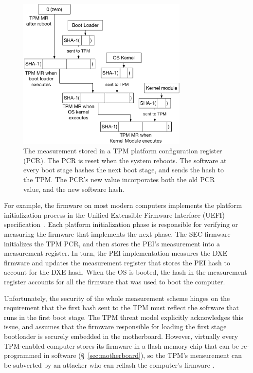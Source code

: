 \begin{figure}[hbt]
  \centering
  \includegraphics[width=85mm]{figures/tpm_measurement.pdf}
  \caption{
    The measurement stored in a TPM platform configuration register (PCR). The
    PCR is reset when the system reboots. The software at every boot stage
    hashes the next boot stage, and sends the hash to the TPM. The PCR's new
    value incorporates both the old PCR value, and the new software hash.
  }
  \label{fig:tpm_measurement}
\end{figure}

For example, the firmware on most modern computers implements the platform
initialization process in the Unified Extensible Firmware Interface (UEFI)
specification~\cite{forum2015uefi}. Each platform initialization phase is
responsible for verifying or measuring the firmware that implements the next
phase. The SEC firmware initializes the TPM PCR, and then stores the PEI's
measurement into a measurement register. In turn, the PEI implementation
measures the DXE firmware and updates the measurement register that stores the
PEI hash to account for the DXE hash. When the OS is booted, the hash in the
measurement register accounts for all the firmware that was used to boot the
computer.

Unfortunately, the security of the whole measurement scheme hinges on the
requirement that the first hash sent to the TPM must reflect the software that
runs in the first boot stage. The TPM threat model explicitly acknowledges this
issue, and assumes that the firmware responsible for loading the first stage
bootloader is securely embedded in the motherboard. However, virtually every
TPM-enabled computer stores its firmware in a flash memory chip that can be
re-programmed in software (\S~\ref{sec:motherboard}), so the TPM's measurement
can be subverted by an attacker who can reflash the computer's firmware
\cite{butterworth2013bios}.

